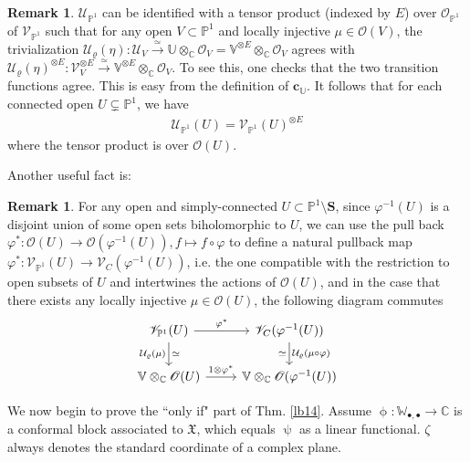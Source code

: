 \documentclass[12pt,a4paper,notitlepage]{article}
\theoremstyle{definition}
\newtheorem{rem}[df]{Remark}
\theoremstyle{plain}
\newcommand{\fk}{\mathfrak}
\newcommand{\mc}{\mathcal}
\newcommand{\scr}{\mathscr}
\newcommand{\blt}{\bullet}
\newcommand{\Vbb}{\mathbb V}
\newcommand{\Ubb}{\mathbb U}
\newcommand{\Wbb}{\mathbb W}
\newcommand{\Cbb}{\mathbb C}
\newcommand{\Pbb}{\mathbb P}
\newcommand{\cbf}{\mathbf c}
\newcommand{\Sbf}{\mathbf{S}}
\numberwithin{equation}{subsection}
\begin{document}
\begin{rem}\label{lb15}
$\scr U_{\Pbb^1}$ can be identified with a tensor product (indexed by $E$) over $\scr O_{\Pbb^1}$ of $\scr V_{\Pbb^1}$ such that for any open $V\subset\Pbb^1$ and locally injective $\mu\in\scr O(V)$, the trivialization $\mc U_\varrho(\eta):\scr U_V\xrightarrow{\simeq}\Ubb\otimes_\Cbb\scr O_V=\Vbb^{\otimes E}\otimes_\Cbb\scr O_V$ agrees with $\mc U_\varrho(\eta)^{\otimes E}:\scr V_V^{\otimes E}\xrightarrow{\simeq}\Vbb^{\otimes E}\otimes_\Cbb\scr O_V$. To see this, one checks that the two transition functions agree. This is easy from the definition of $\cbf_\Ubb$. It follows that for each connected open $U\subsetneq\Pbb^1$, we have
\begin{align}
\scr U_{\Pbb^1}(U)=\scr V_{\Pbb^1}(U)^{\otimes E}\label{eq41}
\end{align}
where the tensor product is over $\scr O(U)$.
\end{rem}

Another useful fact is:

\begin{rem}\label{lb16}
For any open and simply-connected $U\subset\Pbb^1\setminus\Sbf$, since $\varphi^{-1}(U)$ is a disjoint union of some open sets biholomorphic to $U$, we can use the pull back $\varphi^*:\scr O(U)\rightarrow\scr O(\varphi^{-1}(U)),f\mapsto f\circ\varphi$ to define a natural pullback map $\varphi^*:\scr V_{\Pbb^1}(U)\rightarrow\scr V_C(\varphi^{-1}(U))$, i.e. the one compatible with the restriction to open subsets of $U$ and intertwines the actions of $\scr O(U)$, and in the case that there exists any locally injective $\mu\in\scr O(U)$, the following diagram commutes
\begin{equation}\label{eq36}
	\begin{tikzcd}
		\scr V_{\Pbb^1}(U) \arrow[r, "\varphi^*"] \arrow[d,"\mc U_\varrho(\mu)"', "\simeq"] &\scr V_C(\varphi^{-1}(U)) \arrow[d, "\mc U_\varrho(\mu\circ\varphi)", "\simeq"']\\
		\Vbb\otimes_\Cbb\scr O(U)\arrow[r,"1\otimes\varphi^*"] &\Vbb\otimes_\Cbb\scr O(\varphi^{-1}(U))
	\end{tikzcd}	
\end{equation} 
\end{rem}








We now begin to prove the ``only if" part of Thm. \ref{lb14}. Assume $\upphi:\Wbb_{\blt,\blt}\rightarrow\Cbb$ is a conformal block associated to $\fk X$, which equals $\uppsi$ as a linear functional. $\zeta$ always denotes the standard coordinate of a complex plane.
 
\end{document}
